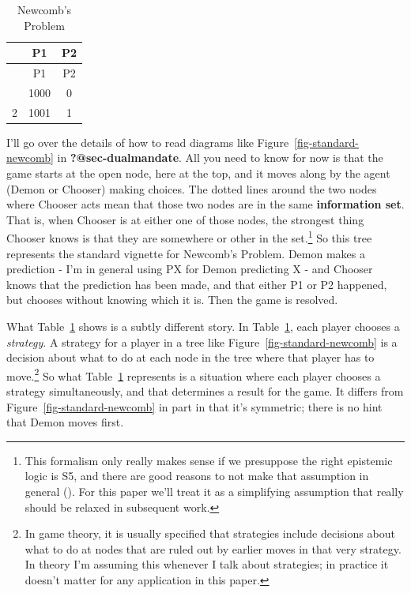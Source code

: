 \documentclass[
  10pt,
  letterpaper,
  DIV=11,
  numbers=noendperiod,
  twoside]{scrartcl}
\begin{document}
\begin{longtable}[]{@{}ccc@{}}
\caption{Newcomb's Problem}\label{tbl-standard-newcomb}\tabularnewline
\toprule\noalign{}
& P1 & P2 \\
\midrule\noalign{}
\endfirsthead
\toprule\noalign{}
& P1 & P2 \\
\midrule\noalign{}
\endhead
\bottomrule\noalign{}
\endlastfoot
1 & 1000 & 0 \\
2 & 1001 & 1 \\
\end{longtable}

I'll go over the details of how to read diagrams like
Figure~\ref{fig-standard-newcomb} in \textbf{?@sec-dualmandate}. All you
need to know for now is that the game starts at the open node, here at
the top, and it moves along by the agent (Demon or Chooser) making
choices. The dotted lines around the two nodes where Chooser acts mean
that those two nodes are in the same \textbf{information set}. That is,
when Chooser is at either one of those nodes, the strongest thing
Chooser knows is that they are somewhere or other in the set.\footnote{This
  formalism only really makes sense if we presuppose the right epistemic
  logic is S5, and there are good reasons to not make that assumption in
  general ().
  For this paper we'll treat it as a simplifying assumption that really
  should be relaxed in subsequent work.} So this tree represents the
standard vignette for Newcomb's Problem. Demon makes a prediction - I'm
in general using PX for Demon predicting X - and Chooser knows that the
prediction has been made, and that either P1 or P2 happened, but chooses
without knowing which it is. Then the game is resolved.

What Table~\ref{tbl-standard-newcomb} shows is a subtly different story.
In Table~\ref{tbl-standard-newcomb}, each player chooses a
\emph{strategy}. A strategy for a player in a tree like
Figure~\ref{fig-standard-newcomb} is a decision about what to do at each
node in the tree where that player has to move.\footnote{In game theory,
  it is usually specified that strategies include decisions about what
  to do at nodes that are ruled out by earlier moves in that very
  strategy. In theory I'm assuming this whenever I talk about
  strategies; in practice it doesn't matter for any application in this
  paper.} So what Table~\ref{tbl-standard-newcomb} represents is a
situation where each player chooses a strategy simultaneously, and that
determines a result for the game. It differs from
Figure~\ref{fig-standard-newcomb} in part in that it's symmetric; there
is no hint that Demon moves first.
\end{document}
